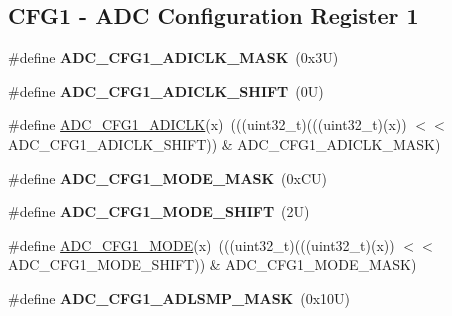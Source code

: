 \subsection*{C\+F\+G1 -\/ A\+DC Configuration Register 1}
\begin{DoxyCompactItemize}
\item 
\mbox{\label{group___a_d_c___register___masks_ga849c3ef9995df85776d7d739475cfdd0}} 
\#define {\bfseries A\+D\+C\+\_\+\+C\+F\+G1\+\_\+\+A\+D\+I\+C\+L\+K\+\_\+\+M\+A\+SK}~(0x3\+U)
\item 
\mbox{\label{group___a_d_c___register___masks_ga889634c9b4122a2d39f3a986688a1662}} 
\#define {\bfseries A\+D\+C\+\_\+\+C\+F\+G1\+\_\+\+A\+D\+I\+C\+L\+K\+\_\+\+S\+H\+I\+FT}~(0\+U)
\item 
\#define \mbox{\hyperlink{group___a_d_c___register___masks_ga1f7b28bec60a20af8775724a4b33a6e6}{A\+D\+C\+\_\+\+C\+F\+G1\+\_\+\+A\+D\+I\+C\+LK}}(x)~(((uint32\+\_\+t)(((uint32\+\_\+t)(x)) $<$$<$ A\+D\+C\+\_\+\+C\+F\+G1\+\_\+\+A\+D\+I\+C\+L\+K\+\_\+\+S\+H\+I\+FT)) \& A\+D\+C\+\_\+\+C\+F\+G1\+\_\+\+A\+D\+I\+C\+L\+K\+\_\+\+M\+A\+SK)
\item 
\mbox{\label{group___a_d_c___register___masks_gad484c90743265c228af52bf695aaec83}} 
\#define {\bfseries A\+D\+C\+\_\+\+C\+F\+G1\+\_\+\+M\+O\+D\+E\+\_\+\+M\+A\+SK}~(0x\+C\+U)
\item 
\mbox{\label{group___a_d_c___register___masks_ga0dc0ce86ab632e5fa2344da9f8617f64}} 
\#define {\bfseries A\+D\+C\+\_\+\+C\+F\+G1\+\_\+\+M\+O\+D\+E\+\_\+\+S\+H\+I\+FT}~(2\+U)
\item 
\#define \mbox{\hyperlink{group___a_d_c___register___masks_gabdbbdc3e2263f1d453aac3fef184d997}{A\+D\+C\+\_\+\+C\+F\+G1\+\_\+\+M\+O\+DE}}(x)~(((uint32\+\_\+t)(((uint32\+\_\+t)(x)) $<$$<$ A\+D\+C\+\_\+\+C\+F\+G1\+\_\+\+M\+O\+D\+E\+\_\+\+S\+H\+I\+FT)) \& A\+D\+C\+\_\+\+C\+F\+G1\+\_\+\+M\+O\+D\+E\+\_\+\+M\+A\+SK)
\item 
\mbox{\label{group___a_d_c___register___masks_ga3f96490246c5bef5f9ccede781423b22}} 
\#define {\bfseries A\+D\+C\+\_\+\+C\+F\+G1\+\_\+\+A\+D\+L\+S\+M\+P\+\_\+\+M\+A\+SK}~(0x10\+U)
\item 
\mbox{\label{group___a_d_c___register___masks_gab2cd2b0ee8a3e6c0e3710e5477ba4f25}} 

\end{DoxyCompactItemize}
